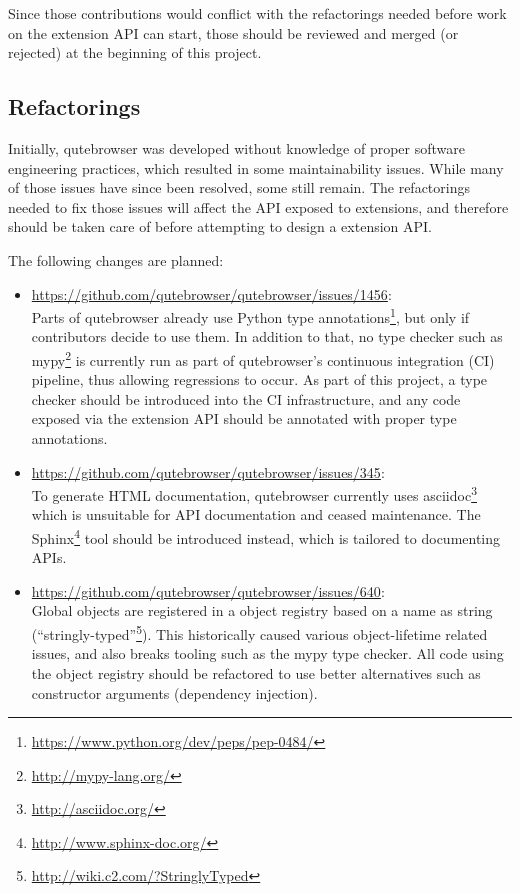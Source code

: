 Since those contributions would conflict with the refactorings needed before
work on the extension API can start, those should be reviewed and merged (or
rejected) at the beginning of this project.

\subsection{Refactorings}
\label{sec:goals-refactorings}

Initially, qutebrowser was developed without knowledge of proper software
engineering practices, which resulted in some maintainability issues. While many
of those issues have since been resolved, some still remain. The refactorings
needed to fix those issues will affect the API exposed to extensions, and
therefore should be taken care of before attempting to design a extension API.

The following changes are planned:

\begin{itemize}
  \item \url{https://github.com/qutebrowser/qutebrowser/issues/1456}: \\
    Parts of qutebrowser already use Python type
    annotations\footnote{\url{https://www.python.org/dev/peps/pep-0484/}}, but
    only if contributors decide to use them. In addition to that, no type
    checker such as mypy\footnote{\url{http://mypy-lang.org/}} is currently run
    as part of qutebrowser's continuous integration (CI) pipeline, thus allowing
    regressions to occur. As part of this project, a type checker should be
    introduced into the CI infrastructure, and any code exposed via the extension
    API should be annotated with proper type annotations.
  \item \url{https://github.com/qutebrowser/qutebrowser/issues/345}: \\
    To generate HTML documentation, qutebrowser currently uses
    asciidoc\footnote{\url{http://asciidoc.org/}} which is unsuitable for API
    documentation and ceased maintenance. The
    Sphinx\footnote{\url{http://www.sphinx-doc.org/}} tool should be
    introduced instead, which is tailored to documenting APIs.
  \item \url{https://github.com/qutebrowser/qutebrowser/issues/640}: \\
    Global objects are registered in a object registry based on a name as
    string (``stringly-typed''\footnote{\url{http://wiki.c2.com/?StringlyTyped}}).
    This historically caused various object-lifetime related issues, and also
breaks tooling such as the mypy type checker. All code using the object registry
should be refactored to use better alternatives such as constructor arguments
(dependency injection).
\end{itemize}

